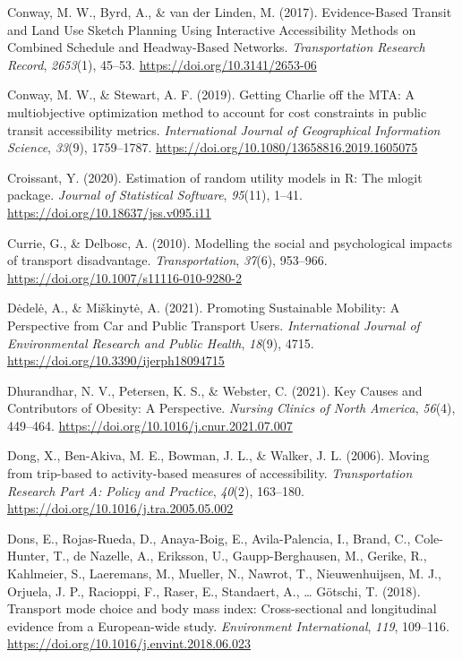 \documentclass[
  letterpaper,
  authoryear,
  review,
  3p]{elsarticle}
\newlength{\cslhangindent}
\newlength{\cslentryspacingunit} %
\newenvironment{CSLReferences}[2] %
 {%
  \setlength{\parindent}{0pt}
  \ifodd #1
  \let\oldpar\par
  \def\par{\hangindent=\cslhangindent\oldpar}
  \fi
  \setlength{\parskip}{#2\cslentryspacingunit}
 }%
 {}
\begin{document}
\begin{CSLReferences}{1}{0}
\leavevmode{}%
Conway, M. W., Byrd, A., \& van der Linden, M. (2017). Evidence-{Based
Transit} and {Land Use Sketch Planning Using Interactive Accessibility
Methods} on {Combined Schedule} and {Headway-Based Networks}.
\emph{Transportation Research Record}, \emph{2653}(1), 45--53.
\url{https://doi.org/10.3141/2653-06}

\leavevmode{}%
Conway, M. W., \& Stewart, A. F. (2019). Getting {Charlie} off the
{MTA}: A multiobjective optimization method to account for cost
constraints in public transit accessibility metrics. \emph{International
Journal of Geographical Information Science}, \emph{33}(9), 1759--1787.
\url{https://doi.org/10.1080/13658816.2019.1605075}

\leavevmode{}%
Croissant, Y. (2020). Estimation of random utility models in {R}: The
{mlogit} package. \emph{Journal of Statistical Software}, \emph{95}(11),
1--41. \url{https://doi.org/10.18637/jss.v095.i11}

\leavevmode{}%
Currie, G., \& Delbosc, A. (2010). Modelling the social and
psychological impacts of transport disadvantage. \emph{Transportation},
\emph{37}(6), 953--966. \url{https://doi.org/10.1007/s11116-010-9280-2}

\leavevmode{}%
Dėdelė, A., \& Miškinytė, A. (2021). Promoting {Sustainable Mobility}:
{A Perspective} from {Car} and {Public Transport Users}.
\emph{International Journal of Environmental Research and Public
Health}, \emph{18}(9), 4715.
\url{https://doi.org/10.3390/ijerph18094715}

\leavevmode{}%
Dhurandhar, N. V., Petersen, K. S., \& Webster, C. (2021). Key {Causes}
and {Contributors} of {Obesity}: {A Perspective}. \emph{Nursing Clinics
of North America}, \emph{56}(4), 449--464.
\url{https://doi.org/10.1016/j.cnur.2021.07.007}

\leavevmode{}%
Dong, X., Ben-Akiva, M. E., Bowman, J. L., \& Walker, J. L. (2006).
Moving from trip-based to activity-based measures of accessibility.
\emph{Transportation Research Part A: Policy and Practice},
\emph{40}(2), 163--180. \url{https://doi.org/10.1016/j.tra.2005.05.002}

\leavevmode{}%
Dons, E., Rojas-Rueda, D., Anaya-Boig, E., Avila-Palencia, I., Brand,
C., Cole-Hunter, T., de Nazelle, A., Eriksson, U., Gaupp-Berghausen, M.,
Gerike, R., Kahlmeier, S., Laeremans, M., Mueller, N., Nawrot, T.,
Nieuwenhuijsen, M. J., Orjuela, J. P., Racioppi, F., Raser, E.,
Standaert, A., \ldots{} Götschi, T. (2018). Transport mode choice and
body mass index: {Cross-sectional} and longitudinal evidence from a
{European-wide} study. \emph{Environment International}, \emph{119},
109--116. \url{https://doi.org/10.1016/j.envint.2018.06.023}


\end{CSLReferences}
\end{document}
